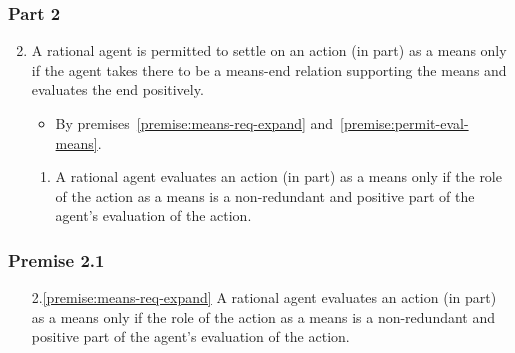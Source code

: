 \documentclass[noamssymb,
]{beamer} %
\newcommand{\hozlinedash}[0]{%
  \noindent\hdashrule[0.5ex][c]{\textwidth}{.1pt}{2.5pt}
}
\begin{document}
\begin{frame}
  \frametitle{Part 2}

  \begin{enumerate}
    \setcounter{enumi}{1}
\item A rational agent is permitted to settle on an action (in part) as a means only if the agent takes there to be a means-end relation supporting the means and evaluates the end positively.
  \begin{itemize}
  \item By premises~\ref{premise:means-req-expand} and~\ref{premise:permit-eval-means}.
  \end{itemize}
  \begin{enumerate}
  \item\label{premise:means-req-expand} A rational agent evaluates an action (in part) as a means only if the role of the action as a means is a non-redundant and positive part of the agent’s evaluation of the action.
  \end{enumerate}
\end{enumerate}

\end{frame}

\begin{frame}
  \frametitle{Premise 2.1}

  \begin{enumerate}
  \item[2.\ref{premise:means-req-expand}] A rational agent evaluates an action (in part) as a means only if the role of the action as a means is a non-redundant and positive part of the agent’s evaluation of the action.
  \end{enumerate}

  \hozlinedash
\end{frame}
\end{document}
